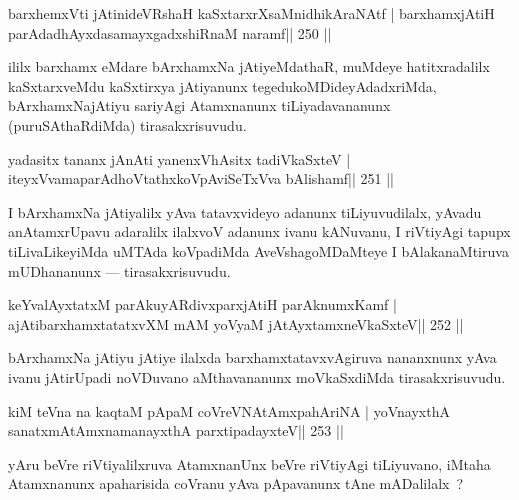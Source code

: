 
\begin{shl}
barxhemxVti jAtinideVRshaH kaSxtarxrXsaMnidhikAraNAtf |
barxhamxjAtiH parAdadhAyxdasamayxgadxshiRnaM naramf\hfill || 250 ||
\end{shl}

\begin{artha}
ililx barxhamx eMdare bArxhamxNa jAtiyeMdathaR, muMdeye hatitxradalilx kaSxtarxveMdu kaSxtirxya jAtiyanunx tegedukoMDideyAdadxriMda, bArxhamxNajAtiyu sariyAgi Atamxnanunx tiLiyadavananunx (puruSAthaRdiMda) tirasakxrisuvudu.
\end{artha}


\begin{shl}
yadasitx tananx jAnAti yanenxVhAsitx tadiVkaSxteV |
iteyxVvamaparAdhoVtathxkoVpAviSeTxVva bAlishamf\hfill || 251 ||
\end{shl}

\begin{artha}
I bArxhamxNa jAtiyalilx yAva tatavxvideyo adanunx tiLiyuvudilalx, yAvadu anAtamxrUpavu adaralilx ilalxvoV adanunx ivanu kANuvanu, I riVtiyAgi tapupx tiLivaLikeyiMda uMTAda koVpadiMda AveVshagoMDaMteye I bAlakanaMtiruva mUDhananunx  {\rm ---}  tirasakxrisuvudu.
\end{artha}

\begin{shl}
keYvalAyxtatxM parAkuyARdivxparxjAtiH parAknumxKamf |
ajAtibarxhamxtatatxvXM mAM yoV\s yaM jAtAyxtamxneVkaSxteV\hfill || 252 ||
\end{shl}

\begin{artha}
bArxhamxNa jAtiyu jAtiye ilalxda barxhamxtatavxvAgiruva nananxnunx yAva ivanu jAtirUpadi noVDuvano aMthavananunx moVkaSxdiMda tirasakxrisuvudu.
\end{artha}


\begin{shl}
kiM teVna na kaqtaM pApaM coVreVNA\s\s tAmxpahAriNA |
yoV\s nayxthA sanatxmAtAmxnamanayxthA parxtipadayxteV\hfill || 253 ||
\end{shl}

\begin{artha}
yAru beVre riVtiyalilxruva AtamxnanUnx beVre riVtiyAgi tiLiyuvano, iMtaha Atamxnanunx apaharisida coVranu yAva pApavanunx tAne mADalilalx~?
\end{artha}

